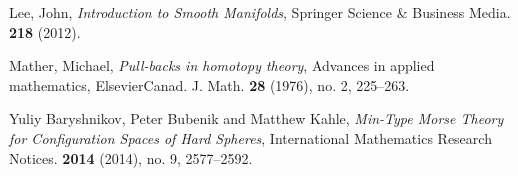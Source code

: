 \documentclass{amsart}
\theoremstyle{definition}
\numberwithin{equation}{section}
\begin{document}
\begin{thebibliography}{10}
\smallskip

 Lee, John, {\it Introduction to Smooth Manifolds}, Springer Science \& Business Media. {\bf 218} (2012).

\smallskip

 Mather, Michael, {\it Pull-backs in homotopy theory}, Advances in applied mathematics, ElsevierCanad. J. Math. {\bf 28} (1976), no. 2, 225--263.

\smallskip

 Yuliy Baryshnikov, Peter Bubenik and Matthew Kahle, {\it Min-Type Morse Theory for Configuration Spaces of Hard Spheres}, International Mathematics Research Notices. {\bf 2014} (2014), no. 9, 2577–2592.


\end{thebibliography}
\end{document}
